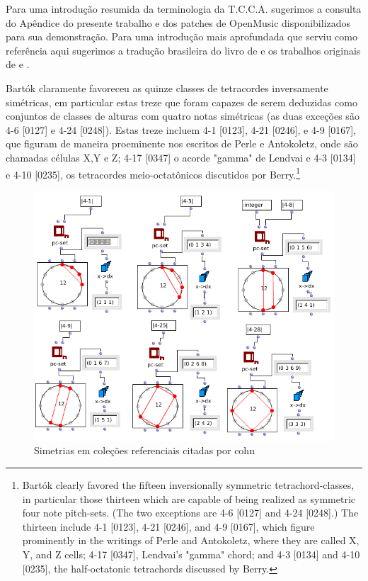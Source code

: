 \documentclass[
	12pt,				%
	openright,			%
	twoside,			%
	a4paper,			%
	english,			%
	french,				%
	spanish,			%
	brazil				%
	]{abntex2}
\begin{document}
Para uma introdução resumida da terminologia da T.C.C.A. sugerimos a consulta do Apêndice do presente trabalho e dos patches de OpenMusic disponibilizados para sua demonstração. Para uma introdução mais aprofundada que serviu como referência aqui sugerimos a tradução brasileira do livro de  e os trabalhos originais de  e .

\begin{citacao}

Bartók claramente favoreceu as quinze classes de tetracordes inversamente simétricas, em particular estas treze que foram capazes de serem deduzidas como conjuntos de classes de alturas com quatro notas simétricas (as duas exceções são 4-6 [0127] e 4-24 [0248]). Estas treze incluem  4-1 [0123], 4-21 [0246], e 4-9 [0167], que figuram de maneira proeminente nos escritos de Perle e Antokoletz, onde são chamadas células X,Y e Z; 4-17 [0347] o acorde "gamma" de Lendvai e 4-3 [0134] e 4-10 [0235], os tetracordes meio-octatônicos discutidos por Berry.\cite[ p.22]{cohn1988inversional}\footnote{
Bartók clearly favored the fifteen inversionally symmetric tetrachord-classes, in particular those thirteen which are capable of being realized as symmetric four note pitch-sets.
(The two exceptions are 4-6 [0127] and 4-24 [0248].) The thirteen include 4-1 [0123], 4-21 [0246], and 4-9 [0167], which figure prominently in the writings of Perle and Antokoletz, where they are called X, Y, and Z cells; 4-17 [0347], Lendvai's "gamma" chord; and 4-3 [0134] and 4-10 [0235], the half-octatonic tetrachords discussed by Berry.\cite[ p.22]{cohn1988inversional}}
\end{citacao}


\begin{figure}[!h]
	\caption{\label{fig_grafico} Simetrias em coleções referenciais citadas por cohn}
	\begin{center}
	    \includegraphics[scale=0.5]{axis/colecoes_simetricas.png}
	\end{center}
\end{figure}
\end{document}
